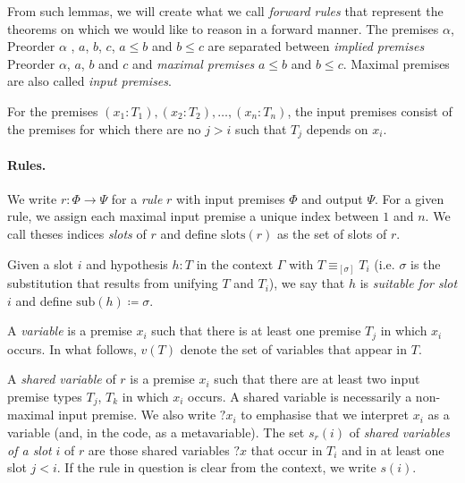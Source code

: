 \documentclass[runningheads]{llncs}
\begin{document}
From such lemmas, we will create what we call \textit{forward rules} that represent the theorems on which we would like to reason in a forward manner.
The premises $\alpha$, $ \text{Preorder } \alpha$ , $a$, $b$, $c$, $a \leq b$ and $b \leq c$ are separated between \textit{implied premises} $\text{Preorder } \alpha$,
$a$, $b$ and $c$ and \textit{maximal premises} $a \leq b$ and $b \leq c$.
Maximal premises are also called \textit{input premises}.

For the premises $(x_1 : T_1),(x_2 : T_2),\dots,(x_n : T_n)$, the input premises consist of the premises for which there are no $j > i$ such that $T_j$ depends on $x_i$.

\paragraph{Rules.}
We write $r : \Phi \to \Psi$ for a \textit{rule} $r$ with input premises $\Phi$ and output $\Psi$.
For a given rule, we assign each maximal input premise a unique index between $1$ and $n$.
We call theses indices \textit{slots} of $r$ and define $\text{slots}(r)$ as the set of slots of $r$.

Given a slot $i$ and hypothesis $h : T$ in the context $\Gamma$ with $T \equiv_{[\sigma]} T_i$ (i.e. $\sigma$ is the substitution that results from unifying $T$ and $T_i$), we say that $h$ is \textit{suitable for slot $i$} and define $\text{sub}(h) ≔ \sigma$.

A \textit{variable} is a premise $x_i$ such that there is at least one premise $T_j$ in which $x_i$ occurs.
In what follows, $v(T)$ denote the set of variables that appear in $T$.

A \textit{shared variable} of $r$ is a premise $x_i$ such that there are at least two input premise types $T_j$, $T_k$ in which $x_i$ occurs.
A shared variable is necessarily a non-maximal input premise.
We also write $?x_i$ to emphasise that we interpret $x_i$ as a variable (and, in the code, as a metavariable).
The set $s_r(i)$ of \textit{shared variables of a slot} $i$ of $r$ are those shared variables $?x$ that occur in $T_i$ and in at least one slot $j < i$.
If the rule in question is clear from the context, we write $s(i)$.
 

\end{document}
